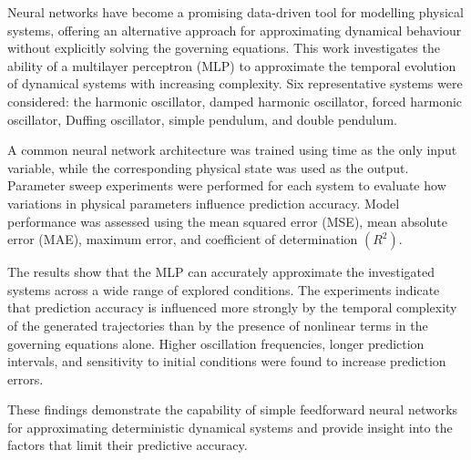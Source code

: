 Neural networks have become a promising data-driven tool for modelling physical systems, offering an alternative approach for approximating dynamical behaviour without explicitly solving the governing equations. This work investigates the ability of a multilayer perceptron (MLP) to approximate the temporal evolution of dynamical systems with increasing complexity. Six representative systems were considered: the harmonic oscillator, damped harmonic oscillator, forced harmonic oscillator, Duffing oscillator, simple pendulum, and double pendulum.

A common neural network architecture was trained using time as the only input variable, while the corresponding physical state was used as the output. Parameter sweep experiments were performed for each system to evaluate how variations in physical parameters influence prediction accuracy. Model performance was assessed using the mean squared error (MSE), mean absolute error (MAE), maximum error, and coefficient of determination $(R^2)$.

The results show that the MLP can accurately approximate the investigated systems across a wide range of explored conditions. The experiments indicate that prediction accuracy is influenced more strongly by the temporal complexity of the generated trajectories than by the presence of nonlinear terms in the governing equations alone. Higher oscillation frequencies, longer prediction intervals, and sensitivity to initial conditions were found to increase prediction errors.

These findings demonstrate the capability of simple feedforward neural networks for approximating deterministic dynamical systems and provide insight into the factors that limit their predictive accuracy.